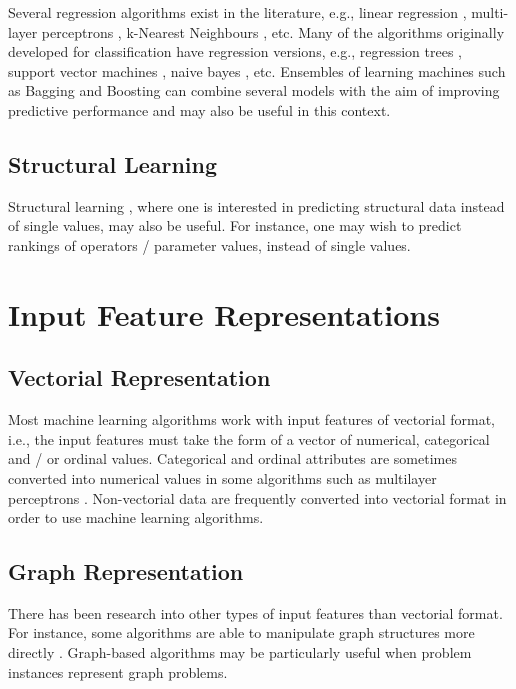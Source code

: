 \documentclass{article}
\begin{document}
Several regression algorithms exist in the literature, e.g., linear regression \cite{Freedman2009}, multi-layer perceptrons \cite{Bishop2006}, k-Nearest Neighbours \cite{MenziesEtAl2014}, etc.  Many of the algorithms originally developed for classification have regression versions, e.g., regression trees \cite{MenziesEtAl2014}, support vector machines \cite{ShaweTaylor2000}, naive bayes \cite{Bishop2006}, etc. Ensembles of learning machines such as Bagging \cite{Breiman1996} and Boosting \cite{Breiman1998} can combine several models with the aim of improving predictive performance and may also be useful in this context.

\subsection{Structural Learning}

Structural learning \cite{Baklr2007}, where one is interested in predicting structural data instead of single values, may also be useful. For instance, one may wish to predict rankings of operators / parameter values, instead of single values. 

\section{Input Feature Representations}
\label{sec:input-features}

\subsection{Vectorial Representation}

Most machine learning algorithms work with input features of vectorial format, i.e., the input features must take the form of a vector of numerical, categorical and / or ordinal values. Categorical and ordinal attributes are sometimes converted into numerical values in some algorithms such as multilayer perceptrons \cite{Bishop2006}. Non-vectorial data are frequently converted into vectorial format in order to use machine learning algorithms.

\subsection{Graph Representation}

There has been research into other types of input features than vectorial format. For instance, some algorithms are able to manipulate graph structures more directly \cite{Torsello2011,Bai2015}. Graph-based algorithms may be particularly useful when problem instances represent graph problems. 
\end{document}

